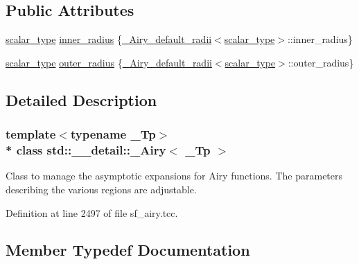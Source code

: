\subsection*{Public Attributes}
\begin{DoxyCompactItemize}
\item 
\hyperlink{classstd_1_1____detail_1_1__Airy_a266cdfcc86b36c8743fd0e102387e1f0}{scalar\+\_\+type} \hyperlink{classstd_1_1____detail_1_1__Airy_ae619970f4c54b7f80340f05b7ead83e1}{inner\+\_\+radius} \{\hyperlink{structstd_1_1____detail_1_1__Airy__default__radii}{\+\_\+\+Airy\+\_\+default\+\_\+radii}$<$\hyperlink{classstd_1_1____detail_1_1__Airy_a266cdfcc86b36c8743fd0e102387e1f0}{scalar\+\_\+type}$>$\+::inner\+\_\+radius\}
\item 
\hyperlink{classstd_1_1____detail_1_1__Airy_a266cdfcc86b36c8743fd0e102387e1f0}{scalar\+\_\+type} \hyperlink{classstd_1_1____detail_1_1__Airy_af688e5d14ed305f95f0e9d9d58d3bf9a}{outer\+\_\+radius} \{\hyperlink{structstd_1_1____detail_1_1__Airy__default__radii}{\+\_\+\+Airy\+\_\+default\+\_\+radii}$<$\hyperlink{classstd_1_1____detail_1_1__Airy_a266cdfcc86b36c8743fd0e102387e1f0}{scalar\+\_\+type}$>$\+::outer\+\_\+radius\}
\end{DoxyCompactItemize}


\subsection{Detailed Description}
\subsubsection*{template$<$typename \+\_\+\+Tp$>$\\*
class std\+::\+\_\+\+\_\+detail\+::\+\_\+\+Airy$<$ \+\_\+\+Tp $>$}

Class to manage the asymptotic expansions for Airy functions. The parameters describing the various regions are adjustable. 

Definition at line 2497 of file sf\+\_\+airy.\+tcc.



\subsection{Member Typedef Documentation}
